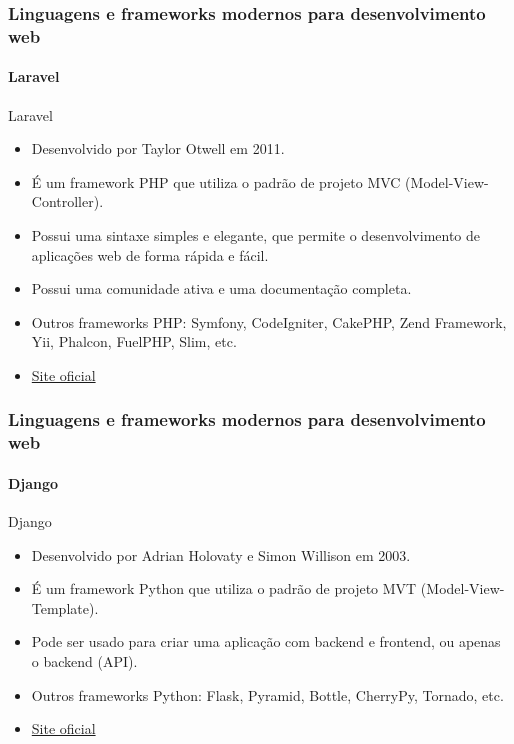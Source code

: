 \documentclass[
	9pt, %
	t, %
]{beamer}
\newcommand{\iconLink}[2]{\href{#1}{\faLink \hspace{0.2em} {#2}}}
\begin{document}
\begin{frame}
	\frametitle{Linguagens e frameworks modernos para desenvolvimento web}
	\framesubtitle{Laravel}

	\begin{block}{Laravel}
		\begin{itemize}
			\item Desenvolvido por Taylor Otwell em 2011. 
			\item É um framework PHP que utiliza o padrão de projeto MVC (Model-View-Controller).
			\item Possui uma sintaxe simples e elegante, que permite o desenvolvimento de aplicações web de forma rápida e fácil.
			\item Possui uma comunidade ativa e uma documentação completa.
			\item Outros frameworks PHP: Symfony, CodeIgniter, CakePHP, Zend Framework, Yii, Phalcon, FuelPHP, Slim, etc.
			\item \iconLink{https://laravel.com/}{Site oficial}
		\end{itemize}
	\end{block}

\end{frame}

\begin{frame}
	\frametitle{Linguagens e frameworks modernos para desenvolvimento web}
	\framesubtitle{Django}

	\begin{block}{Django}
		\begin{itemize}
			\item Desenvolvido por Adrian Holovaty e Simon Willison em 2003. 
			\item É um framework Python que utiliza o padrão de projeto MVT (Model-View-Template).
			\item Pode ser usado para criar uma aplicação com backend e frontend, ou apenas o backend (API).
			\item Outros frameworks Python: Flask, Pyramid, Bottle, CherryPy, Tornado, etc.
			\item \iconLink{https://www.djangoproject.com/}{Site oficial}
		\end{itemize}
	\end{block}

\end{frame}
\end{document}
